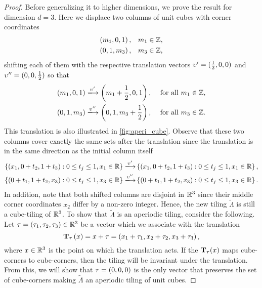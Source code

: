 \documentclass[../thesis.tex]{subfiles}
\begin{document}
\begin{proof}
Before generalizing it to higher dimensions, we prove the result for dimension $d=3$. Here we displace two columns of unit cubes with corner coordinates 
\begin{align*}
    \left(m_1,0,1\right),& \quad m_1 \in \mathbb{Z},\\
    \left(0,1,m_3\right),& \quad m_3 \in \mathbb{Z},
\end{align*}
shifting each of them with the respective translation vectors $\upsilon' = (\frac{1}{2},0,0)$ and $\upsilon'' = (0,0,\frac{1}{2})$ so that
\begin{align*}
    \bracMed{m_1,0,1} \xlongrightarrow[]{\upsilon'} \bracMed{m_1 + \frac{1}{2} ,0,1}, \quad  &\text{ for all } m_1 \in \Z,\\
    \bracMed{0,1,m_3} \xlongrightarrow[]{\upsilon''} \bracMed{0,1,m_3 + \frac{1}{2} },    \quad  &\text{ for all }  m_3 \in \Z.
\end{align*}
This translation is also illustrated in \cref{fig:aperi_cube}. Observe that these two columns cover exactly the same sets after the translation since the translation is in the same direction as the initial column itself
\begin{align*}
    \braqMed{ \bracMed{x_1, 0+t_2,1+t_3} : 0 \leq t_j \leq 1, x_1\in\R} \xlongrightarrow[]{\upsilon'} & \braqMed{ \bracMed{x_1, 0+t_2,1+t_3} : 0 \leq t_j \leq 1, x_1\in\R},\\
    \braqMed{ \bracMed{0+t_1,1+t_2,x_3} : 0 \leq t_j \leq 1, x_3\in\R} \xlongrightarrow[]{\upsilon''} & \braqMed{ \bracMed{0+t_1,1+t_2,x_3} : 0 \leq t_j \leq 1, x_3\in\R}.
\end{align*}
In addition, note that both shifted columns are disjoint in $\mathbb{R}^3$ since their middle corner coordinates $x_2$ differ by a non-zero integer. Hence, the new tiling $\widetilde{\Lambda}$ is still a cube-tiling of $\mathbb{R}^3$. To show that $\widetilde{\Lambda}$ is an aperiodic tiling, consider the following. Let $\tau=(\tau_1,\tau_2,\tau_3)\in \mathbb{R}^3$ be a vector which we associate with the translation
\begin{equation*}
    \mathbf{T}_\tau \left(x\right) = x+\tau = \left(x_1+\tau_1, x_2+\tau_2, x_3+\tau_3\right),
\end{equation*}
where $x\in \mathbb{R}^3$ is the point on which the translation acts. If the $\mathbf{T}_\tau (x)$ maps cube-corners to cube-corners, then the tiling will be invariant under the translation. From this, we will show that $\tau=(0,0,0)$ is the only vector that preserves the set of cube-corners making $\widetilde{\Lambda}$ an aperiodic tiling of unit cubes. 


\end{proof}
\end{document}
